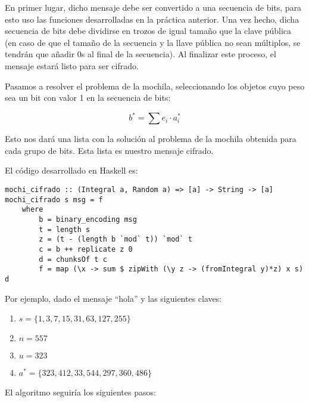 \documentclass[10pt,spanish]{article}
\begin{document}
En primer lugar, dicho mensaje debe ser convertido a una secuencia de bits, para esto uso las funciones desarrolladas en la práctica anterior. Una vez hecho, dicha secuencia de bits debe dividirse en trozos de igual tamaño que la clave pública (en caso de que el tamaño de la secuencia y la llave pública no sean múltiplos, se tendrán que añadir 0s al final de la secuencia). Al finalizar este proceso, el mensaje estará listo para ser cifrado.

Pasamos a resolver el problema de la mochila, seleccionando los objetos cuyo peso sea un bit con valor 1 en la secuencia de bits:

\begin{displaymath}
    b^* = \sum e_i \cdot a_i^*
\end{displaymath}

Esto nos dará una lista con la solución al problema de la mochila obtenida para cada grupo de bits. Esta lista es nuestro mensaje cifrado.

El código desarrollado en Haskell es:

\begin{verbatim}
mochi_cifrado :: (Integral a, Random a) => [a] -> String -> [a]
mochi_cifrado s msg = f
    where
        b = binary_encoding msg
        t = length s
        z = (t - (length b `mod` t)) `mod` t
        c = b ++ replicate z 0
        d = chunksOf t c
        f = map (\x -> sum $ zipWith (\y z -> (fromIntegral y)*z) x s) d
\end{verbatim}

Por ejemplo, dado el mensaje ``hola'' y las siguientes claves:

\begin{enumerate}[\color{azul}{$\longrightarrow$}]
    \item $s = \{1,3,7,15,31,63,127,255\}$
    \item $n = 557$
    \item $u = 323$
    \item $a^* = \{323,412,33,544,297,360,486\}$
\end{enumerate}

El algoritmo seguiría los siguientes pasos:
\end{document}
